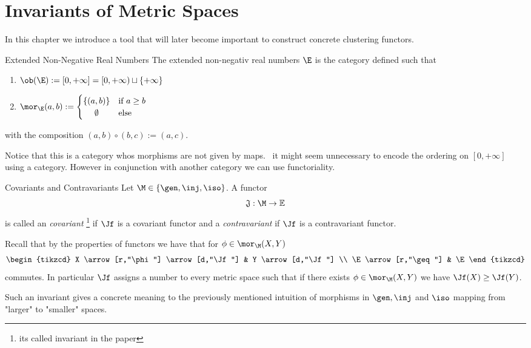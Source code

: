 \chapter*{Invariants of Metric Spaces}

In this chapter we introduce a tool that will later become important to construct concrete clustering functors.

\begin{definition}{Extended Non-Negative Real Numbers}{}
The extended non-negativ real numbers $\E$ is the category defined such that
\begin{enumerate}
    \item $\ob(\E) := [0, +\infty] = [0, +\infty) \sqcup \{+\infty\}$
    \item $\mor_\E(a,b) := \begin{cases}
        \{(a,b)\} & \text{if $a \geq b$} \\
        \hfil \emptyset & \text{else}
    \end{cases}$
\end{enumerate}
with the composition $(a,b) \circ (b,c) := (a,c)$.
\end{definition}
Notice that this is a category whos morphisms are not given by maps. \Apriori\ it might seem unnecessary to encode the ordering on $[0, +\infty]$ using a category. However in conjunction with another category we can use functoriality.

\begin{definition}{Covariants and Contravariants}{}
Let $\M \in \{\gen, \inj, \iso\}$. A functor
$$\mathfrak{J}: \M \to \mathbb{E}$$
is called an \emph{covariant}
\footnote{its called invariant in the paper}
if $\Jf$ is a covariant functor and a \emph{contravariant} if $\Jf$ is a contravariant functor.
\end{definition}

\begin{myremark}{}{}
Recall that by the properties of functors we have that for $\phi \in \mor_\M(X,Y)$
\begin{equation*}
\begin{tikzcd}
X \arrow[r,"\phi"] \arrow[d,"\Jf"] & Y \arrow[d,"\Jf"] \\
\E \arrow[r,"\geq"]              & \E   
\end{tikzcd}       
\end{equation*}
commutes. In particular $\Jf$ assigns a number to every metric space such that if there exists $\phi \in \mor_\M(X,Y)$ we have $\Jf(X) \geq \Jf(Y)$.
\end{myremark}
Such an invariant gives a concrete meaning to the previously mentioned intuition of morphisms in $\gen, \inj$ and $\iso$ mapping from "larger" to "smaller" spaces.

